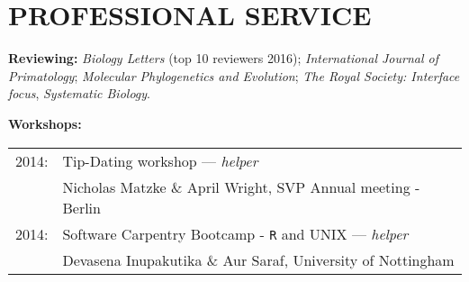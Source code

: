 \documentclass[10pt,a4paper]{article}
\begin{document}
{%


\bigskip


\section{PROFESSIONAL SERVICE}
\raggedright\textbf{Reviewing:}
\textit{Biology Letters} (top 10 reviewers 2016); \textit{International Journal of Primatology}; \textit{Molecular Phylogenetics and Evolution}; \textit{The Royal Society: Interface focus}, \textit{Systematic Biology}.

\bigskip
\raggedright\textbf{Workshops:}

\begin{tabular}{ll}
2014: & Tip-Dating workshop --- \textit{helper}\\
& Nicholas Matzke \& April Wright, SVP Annual meeting - Berlin\\
2014: & Software Carpentry Bootcamp - \texttt{R} and UNIX --- \textit{helper}\\
& Devasena Inupakutika \& Aur Saraf, University of Nottingham\\
\end{tabular}

}
\end{document}
